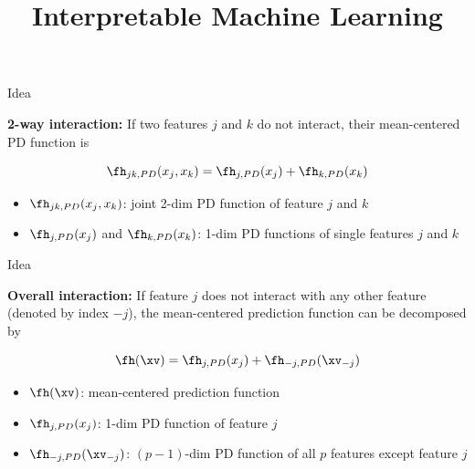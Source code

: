 \documentclass[11pt,compress,t,notes=noshow, aspectratio=169, xcolor=table]{beamer}
\title{Interpretable Machine Learning}
\date{}
\begin{document}
\newcommand{\titlefigure}{figure/h-statistic}
\newcommand{\learninggoals}{
\item Understand Friedman's H-statistic
\item Measure general 2-way interactions between arbitrary features
\item Measure a feature's overall interaction strength
}


\begin{frame}{Idea }

    \textbf{2-way interaction:} If two features $j$ and $k$ do not interact, their mean-centered PD function is

	$$\fh_{jk, PD}(x_j, x_k) = \fh_{j, PD}(x_j) + \fh_{k, PD}(x_k)$$

\begin{itemize}
	\item $\fh_{jk, PD}(x_j, x_k)$: joint 2-dim PD function of feature $j$ and $k$
	\item $\fh_{j, PD}(x_j)$ and $\fh_{k, PD}(x_k)$: 1-dim PD functions of single features $j$ and $k$
\end{itemize}

\end{frame}
\begin{frame}{Idea}

	\textbf{Overall interaction:} If feature $j$ does not interact with any other feature (denoted by index $-j$), the mean-centered prediction function can be decomposed by

	$$\fh(\xv) = \fh_{j, PD}(x_j) +  \fh_{-j, PD}(\xv_{-j})$$

\begin{itemize}
	\item $\fh(\xv)$: mean-centered prediction function
	\item $\fh_{j, PD}(x_j)$: 1-dim PD function of feature $j$
	\item $\fh_{-j, PD}(\xv_{-j})$: $(p-1)$-dim PD function of all $p$ features except feature $j$
\end{itemize}
\end{frame}
\end{document}
